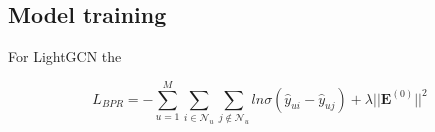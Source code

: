 \subsection{Model training}
For LightGCN the


\begin{equation}
    L_{BPR} = - \sum_{u=1}^{M} \sum_{i \in \mathcal{N}_u} \sum_{j \notin \mathcal{N}_u} ln \sigma (\hat{y}_{ui} - \hat{y}_{uj}) + \lambda || \mathbf{E}^{(0)}||^2
\end{equation}

